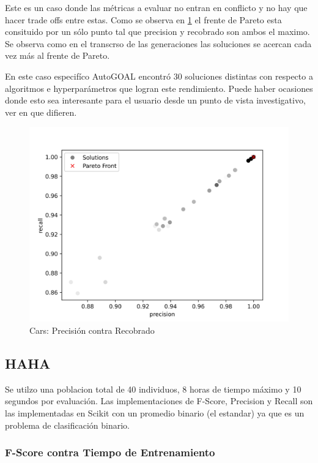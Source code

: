 Este es un caso donde las m\'etricas a evaluar no entran en conflicto y no hay que hacer trade offs entre estas. Como se observa en \ref{impl:fig:cars:precision_vs_recall} el frente de Pareto esta consituido por un s\'olo punto tal que precision y recobrado son ambos el maximo. Se observa como en el transcrso de las generaciones las soluciones se acercan cada vez m\'as al frente de Pareto.

En este caso especif\'ico AutoGOAL encontr\'o 30 soluciones distintas con respecto a algoritmos e hyperpar\'ametros que logran este rendimiento. Puede haber ocasiones donde esto sea interesante para el usuario desde un punto de vista investigativo, ver en que difieren.


\begin{figure}[H]
    \centering
    \includegraphics[scale=0.75]{Pictures/cars_precision_vs_recall.jpg}
    \caption{Cars: Precisi\'on contra Recobrado}
    \label{impl:fig:cars:precision_vs_recall}
\end{figure}

\subsection{HAHA}

Se utilzo una poblacion total de 40 individuos, 8 horas de tiempo m\'aximo y 10 segundos por  evaluaci\'on. Las implementaciones de F-Score, Precision y Recall son las implementadas en Scikit con un promedio binario (el estandar) ya que es un problema de clasificaci\'on binario.

\subsubsection{F-Score contra Tiempo de Entrenamiento}

